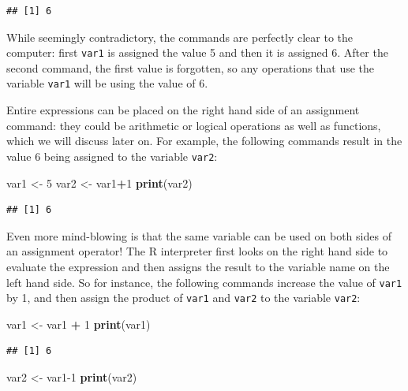 \documentclass[
]{book}
\newenvironment{Shaded}{\begin{snugshade}}{\end{snugshade}}
\newcommand{\DecValTok}[1]{\textcolor[rgb]{0.00,0.00,0.81}{#1}}
\newcommand{\KeywordTok}[1]{\textcolor[rgb]{0.13,0.29,0.53}{\textbf{#1}}}
\newcommand{\NormalTok}[1]{#1}
\newcommand{\OperatorTok}[1]{\textcolor[rgb]{0.81,0.36,0.00}{\textbf{#1}}}
\newcommand{\StringTok}[1]{\textcolor[rgb]{0.31,0.60,0.02}{#1}}
\begin{document}
\begin{verbatim}
## [1] 6
\end{verbatim}

While seemingly contradictory, the commands are perfectly clear to the computer: first \texttt{var1} is assigned the value 5 and then it is assigned 6. After the second command, the first value is forgotten, so any operations that use the variable \texttt{var1} will be using the value of 6.

Entire expressions can be placed on the right hand side of an assignment command: they could be arithmetic or logical operations as well as functions, which we will discuss later on. For example, the following commands result in the value 6 being assigned to the variable \texttt{var2}:

\begin{Shaded}
\begin{Highlighting}[]
\NormalTok{var1 \textless{}{-}}\StringTok{ }\DecValTok{5}
\NormalTok{var2 \textless{}{-}}\StringTok{ }\NormalTok{var1}\OperatorTok{+}\DecValTok{1}
\KeywordTok{print}\NormalTok{(var2)}
\end{Highlighting}
\end{Shaded}

\begin{verbatim}
## [1] 6
\end{verbatim}

Even more mind-blowing is that the same variable can be used on both sides of an assignment operator! The R interpreter first looks on the right hand side to evaluate the expression and then assigns the result to the variable name on the left hand side. So for instance, the following commands increase the value of \texttt{var1} by 1, and then assign the product of \texttt{var1} and \texttt{var2} to the variable \texttt{var2}:

\begin{Shaded}
\begin{Highlighting}[]
\NormalTok{var1 \textless{}{-}}\StringTok{ }\NormalTok{var1 }\OperatorTok{+}\StringTok{ }\DecValTok{1}
\KeywordTok{print}\NormalTok{(var1)}
\end{Highlighting}
\end{Shaded}

\begin{verbatim}
## [1] 6
\end{verbatim}

\begin{Shaded}
\begin{Highlighting}[]
\NormalTok{var2 \textless{}{-}}\StringTok{ }\NormalTok{var1}\DecValTok{{-}1}
\KeywordTok{print}\NormalTok{(var2)}
\end{Highlighting}
\end{Shaded}
\end{document}
